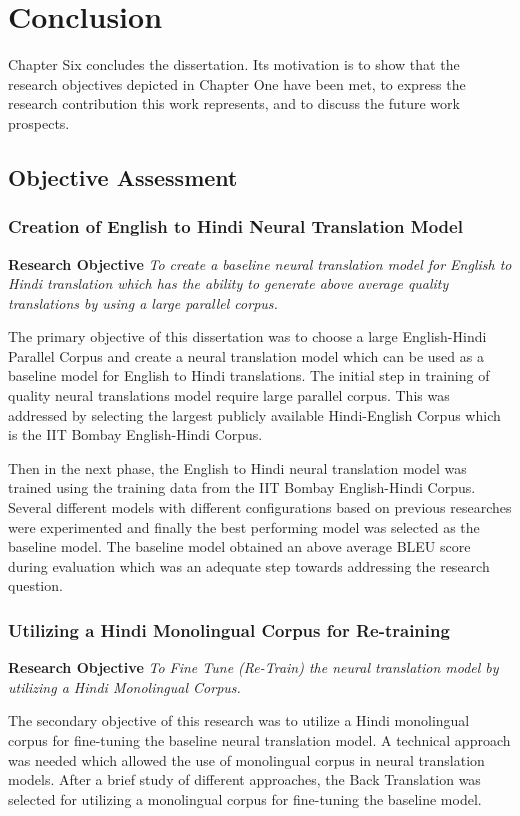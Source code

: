 \chapter{Conclusion}
Chapter Six concludes the dissertation. Its motivation is to show that the research objectives depicted in Chapter One have been met, to express the research contribution this work represents, and to discuss the future work prospects.

\section{Objective Assessment}
\subsection{Creation of English to Hindi Neural Translation Model}
\textbf{Research Objective} \textit{To create a baseline neural translation model for English to Hindi translation which has the ability to generate above average quality translations by using a large parallel corpus.
}

The primary objective of this dissertation was to choose a large English-Hindi Parallel Corpus and create a neural translation model which can be used as a baseline model for English to Hindi translations. The initial step in training of quality neural translations model require large parallel corpus. This was addressed by selecting the largest publicly available Hindi-English Corpus which is the IIT Bombay English-Hindi Corpus. 

Then in the next phase, the English to Hindi neural translation model was trained using the training data from the IIT Bombay English-Hindi Corpus. Several different models with different configurations based on previous researches were experimented and finally the best performing model was selected as the baseline model. The baseline model obtained an above average BLEU score during evaluation which was an adequate step towards addressing the research question.

\subsection{Utilizing a Hindi Monolingual Corpus for Re-training}
\textbf{Research Objective} \textit{To Fine Tune (Re-Train) the neural translation model by utilizing  a  Hindi Monolingual Corpus.}

The secondary objective of this research was to utilize a Hindi monolingual corpus for fine-tuning the baseline neural translation model. A technical approach was needed which allowed the use of monolingual corpus in neural translation models. After a brief study of different approaches, the Back Translation was selected for utilizing a monolingual corpus for fine-tuning the baseline model.

